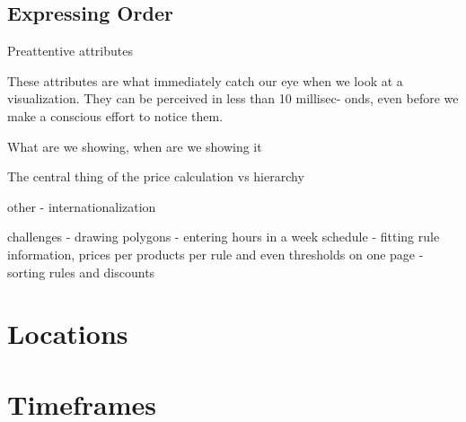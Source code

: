 \subsection{Expressing Order}
Preattentive attributes

These attributes are what immediately catch our eye when we look at a visualization. They can be perceived in less than 10 millisec-
onds, even before we make a conscious effort to notice them.


What are we showing, when are we showing it

The central thing of the price calculation vs hierarchy

other
- internationalization

challenges
- drawing polygons
- entering hours in a week schedule
- fitting rule information, prices per products per rule and even thresholds on one page
- sorting rules and discounts

\section{Locations}
\section{Timeframes}